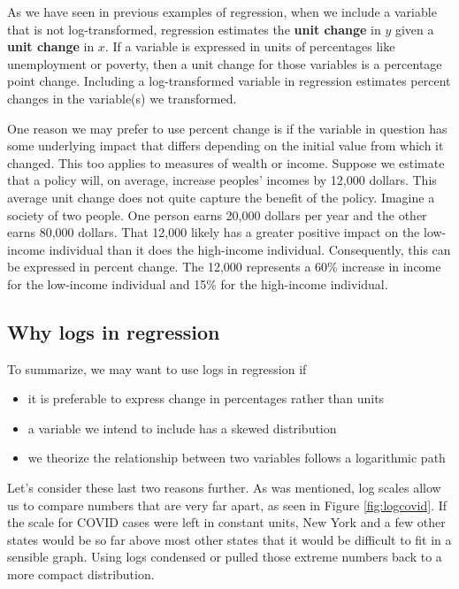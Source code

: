 \documentclass[
]{book}
\providecommand{\tightlist}{%
  \setlength{\itemsep}{0pt}\setlength{\parskip}{0pt}}
\begin{document}
As we have seen in previous examples of regression, when we include a variable that is not log-transformed, regression estimates the \textbf{unit change} in \(y\) given a \textbf{unit change} in \(x\). If a variable is expressed in units of percentages like unemployment or poverty, then a unit change for those variables is a percentage point change. Including a log-transformed variable in regression estimates percent changes in the variable(s) we transformed.

One reason we may prefer to use percent change is if the variable in question has some underlying impact that differs depending on the initial value from which it changed. This too applies to measures of wealth or income. Suppose we estimate that a policy will, on average, increase peoples' incomes by 12,000 dollars. This average unit change does not quite capture the benefit of the policy. Imagine a society of two people. One person earns 20,000 dollars per year and the other earns 80,000 dollars. That 12,000 likely has a greater positive impact on the low-income individual than it does the high-income individual. Consequently, this can be expressed in percent change. The 12,000 represents a 60\% increase in income for the low-income individual and 15\% for the high-income individual.

\hypertarget{why-logs-in-regression}{%
\subsection{Why logs in regression}\label{why-logs-in-regression}}

To summarize, we may want to use logs in regression if

\begin{itemize}
\tightlist
\item
  it is preferable to express change in percentages rather than units
\item
  a variable we intend to include has a skewed distribution
\item
  we theorize the relationship between two variables follows a logarithmic path
\end{itemize}

Let's consider these last two reasons further. As was mentioned, log scales allow us to compare numbers that are very far apart, as seen in Figure \ref{fig:logcovid}. If the scale for COVID cases were left in constant units, New York and a few other states would be so far above most other states that it would be difficult to fit in a sensible graph. Using logs condensed or pulled those extreme numbers back to a more compact distribution.
\end{document}
